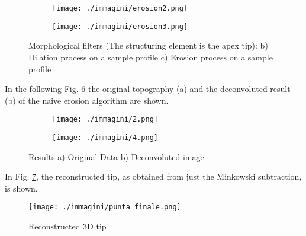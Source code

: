 \begin{figure}[ht]
    \centering
    \begin{subfigure}[b]{0.45\textwidth}
        \texttt{[image: ./immagini/erosion2.png]}
        \caption{}
        \label{fig:filter_a}
    \end{subfigure}
    \hfill
    \begin{subfigure}[b]{0.45\textwidth}
        \texttt{[image: ./immagini/erosion3.png]}
        \caption{}
        \label{fig:filter_b}
    \end{subfigure}
    \caption{Morphological filters (The structuring element is the apex tip): b) Dilation process on a sample profile c) Erosion process on a sample profile}
    \label{fig:filter}
\end{figure}

\newpage

In the following Fig. \ref{fig:confronto_pre_post} the original topography (a) and the deconvoluted result (b) of the naive erosion algorithm are shown.

\begin{figure}[ht]
    \centering
    \begin{subfigure}[b]{0.40\textwidth}
        \texttt{[image: ./immagini/2.png]}
        \caption{}
        \label{fig:prima}
    \end{subfigure}
    \hfill
    \begin{subfigure}[b]{0.40\textwidth}
        \texttt{[image: ./immagini/4.png]}
        \caption{}
        \label{fig:dopo}
    \end{subfigure}
    \caption{Results a) Original Data b) Deconvoluted image}
    \label{fig:confronto_pre_post}
\end{figure}

In Fig. \ref{fig:tiptredi}, the reconstructed tip, as obtained from just the Minkowski subtraction, is shown. 

\begin{figure}[ht]
    \centering
    \texttt{[image: ./immagini/punta\_finale.png]}
    \caption{Reconstructed 3D tip}
    \label{fig:tiptredi}
\end{figure}